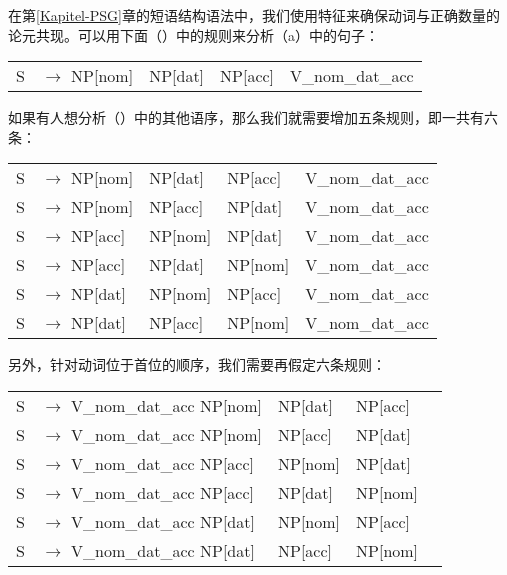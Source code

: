 \noindent
在第\ref{Kapitel-PSG}章的短语结构语法中，我们使用特征来确保动词与正确数量的论元共现。可以用下面（）中的规则来分析（a）中的句子：
\ea
\begin{tabular}[t]{@{}l@{ }l@{ }l@{ }l@{ }l@{ }}
S  & $\to$ NP[nom]& NP[dat] & NP[acc] & V\_nom\_dat\_acc\\
\end{tabular}
\z
如果有人想分析（）中的其他语序，那么我们就需要增加五条规则，即一共有六条：
\ea
\label{Regeln-PSG-Abfolge}
\begin{tabular}[t]{@{}l@{ }l@{ }l@{ }l@{ }l@{ }}
S  & $\to$ NP[nom]& NP[dat] & NP[acc] & V\_nom\_dat\_acc\\
S  & $\to$ NP[nom]& NP[acc] & NP[dat] & V\_nom\_dat\_acc\\
S  & $\to$ NP[acc]& NP[nom] & NP[dat] & V\_nom\_dat\_acc\\
S  & $\to$ NP[acc]& NP[dat] & NP[nom] & V\_nom\_dat\_acc\\
S  & $\to$ NP[dat]& NP[nom] & NP[acc] & V\_nom\_dat\_acc\\
S  & $\to$ NP[dat]& NP[acc] & NP[nom] & V\_nom\_dat\_acc\\
\end{tabular}
\z

\noindent
另外，针对动词位于首位的顺序，我们需要再假定六条规则：
\ea
\begin{tabular}[t]{@{}l@{ }l@{ }l@{ }l@{ }l}
S  & $\to$ V\_nom\_dat\_acc NP[nom]& NP[dat] & NP[acc]\\
S  & $\to$ V\_nom\_dat\_acc NP[nom]& NP[acc] & NP[dat]\\
S  & $\to$ V\_nom\_dat\_acc NP[acc]& NP[nom] & NP[dat]\\
S  & $\to$ V\_nom\_dat\_acc NP[acc]& NP[dat] & NP[nom]\\
S  & $\to$ V\_nom\_dat\_acc NP[dat]& NP[nom] & NP[acc]\\
S  & $\to$ V\_nom\_dat\_acc NP[dat]& NP[acc] & NP[nom]\\
\end{tabular}
\z

